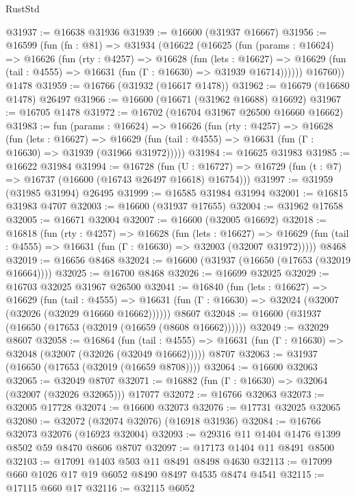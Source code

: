 \begin{lexlean}{RustStd}
\begin{coremodule}
@31937 := @16638 @31936
@31939 := @16600 (@31937 @16667)
@31956 := @16599
    (fun (fn : @81) =>
    @31934
      (@16622
        (@16625
          (fun (params : @16624) =>
          @16626
            (fun (rty : @4257) =>
            @16628
              (fun (lets : @16627) =>
              @16629 (fun (tail : @4555) => @16631 (fun (Γ : @16630) => @31939 @16714))))))
        @16760))
    @1478
@31959 := @16766 (@31932 (@16617 @1478))
@31962 := @16679 (@16680 @1478) @26497
@31966 := @16600 (@16671 (@31962 @16688) @16692)
@31967 := @16705 @1478
@31972 := @16702 (@16704 @31967 @26500 @16660 @16662)
@31983 := fun (params : @16624) =>
  @16626
    (fun (rty : @4257) =>
    @16628
      (fun (lets : @16627) =>
      @16629 (fun (tail : @4555) => @16631 (fun (Γ : @16630) => @31939 (@31966 @31972)))))
@31984 := @16625 @31983
@31985 := @16622 @31984
@31994 := @16728
    (fun (U : @16727) => @16729 (fun (t : @7) => @16737 (@16600 (@16743 @26497 @16618) @16754)))
@31997 := @31959 (@31985 @31994) @26495
@31999 := @16585 @31984 @31994
@32001 := @16815 @31983 @4707
@32003 := @16600 (@31937 @17655)
@32004 := @31962 @17658
@32005 := @16671 @32004
@32007 := @16600 (@32005 @16692)
@32018 := @16818
    (fun (rty : @4257) =>
    @16628
      (fun (lets : @16627) =>
      @16629 (fun (tail : @4555) => @16631 (fun (Γ : @16630) => @32003 (@32007 @31972)))))
    @8468
@32019 := @16656 @8468
@32024 := @16600 (@31937 (@16650 (@17653 (@32019 @16664))))
@32025 := @16700 @8468
@32026 := @16699 @32025
@32029 := @16703 @32025 @31967 @26500
@32041 := @16840
    (fun (lets : @16627) =>
    @16629
      (fun (tail : @4555) =>
      @16631 (fun (Γ : @16630) => @32024 (@32007 (@32026 (@32029 @16660 @16662))))))
    @8607
@32048 := @16600 (@31937 (@16650 (@17653 (@32019 (@16659 (@8608 @16662))))))
@32049 := @32029 @8607
@32058 := @16864
    (fun (tail : @4555) => @16631 (fun (Γ : @16630) => @32048 (@32007 (@32026 (@32049 @16662)))))
    @8707
@32063 := @31937 (@16650 (@17653 (@32019 (@16659 @8708))))
@32064 := @16600 @32063
@32065 := @32049 @8707
@32071 := @16882 (fun (Γ : @16630) => @32064 (@32007 (@32026 @32065))) @17077
@32072 := @16766 @32063
@32073 := @32005 @17728
@32074 := @16600 @32073
@32076 := @17731 @32025 @32065
@32080 := @32072 (@32074 @32076) (@16918 @31936)
@32084 := @16766 @32073 @32076 (@16923 @32004)
@32093 := @29316 @11 @1404 @1476 @1399 @8502 @59 @8470 @8606 @8707
@32097 := @17173 @1404 @11 @8491 @8500
@32103 := @17091 @1403 @503 @11 @8491 @8498 @4630
@32113 := @17099 @660 @1026 @17 @19 @6052 @8490 @8497 @4535 @8474 @4541
@32115 := @17115 @660 @17
@32116 := @32115 @6052

\end{coremodule}
\end{lexlean}
